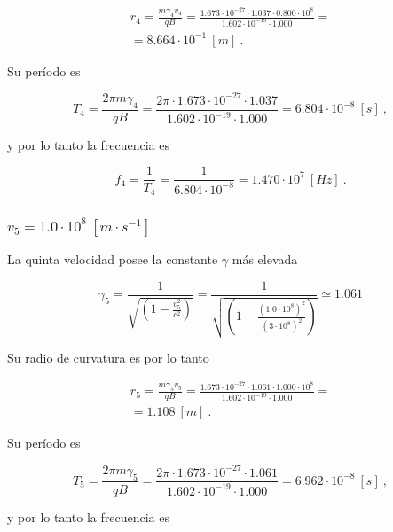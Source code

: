 \documentclass[journal]{IEEEtran}
\begin{document}
\begin{align}
r_4 = \displaystyle\frac{m\gamma_4v_4}{qB} = \displaystyle\frac{1.673\cdot 10^{-27}\cdot 1.037 \cdot 0.800\cdot 10^8}{1.602\cdot 10^{-19}\cdot 1.000} = \\
= 8.664\cdot 10^{-1}~[m]~.
\end{align}

Su período es

\begin{equation}
T_4 = \displaystyle\frac{2\pi m\gamma_4}{qB} = \displaystyle\frac{2\pi \cdot 1.673\cdot 10^{-27}\cdot 1.037}{1.602\cdot 10^{-19}\cdot 1.000} = 6.804\cdot 10^{-8}~[s]~,
\end{equation}

y por lo tanto la frecuencia es

\begin{equation}
f_4 = \displaystyle\frac{1}{T_4} = \displaystyle\frac{1}{6.804\cdot 10^{-8}} = 1.470\cdot 10^7~[Hz]~.
\end{equation}

\subsubsection{$v_5 = 1.0\cdot 10^8~[m\cdot s^{-1}]$}

La quinta velocidad posee la constante $\gamma$ más elevada

\begin{equation}
\gamma_5 = \displaystyle\frac{1}{\sqrt{(1-\displaystyle\frac{v_5^2}{c^2})}} = \displaystyle\frac{1}{\sqrt{(1-\displaystyle\frac{(1.0\cdot 10^8)^2}{(3\cdot 10^8)^2})}} \simeq 1.061
\end{equation}

Su radio de curvatura es por lo tanto

\begin{align}
r_5 = \displaystyle\frac{m\gamma_5v_5}{qB} = \displaystyle\frac{1.673\cdot 10^{-27}\cdot 1.061 \cdot 1.000\cdot 10^8}{1.602\cdot 10^{-19}\cdot 1.000} = \\
= 1.108~[m]~.
\end{align}

Su período es

\begin{equation}
T_5 = \displaystyle\frac{2\pi m\gamma_5}{qB} = \displaystyle\frac{2\pi \cdot 1.673\cdot 10^{-27}\cdot 1.061}{1.602\cdot 10^{-19}\cdot 1.000} = 6.962\cdot 10^{-8}~[s]~,
\end{equation}

y por lo tanto la frecuencia es
\end{document}
